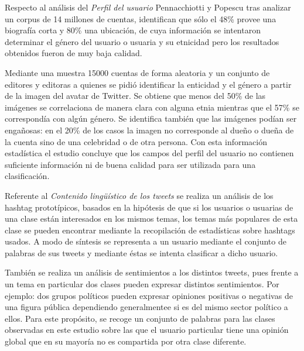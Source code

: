 	        Respecto al análisis del \emph{Perfil del usuario} Pennacchiotti y Popescu tras analizar un corpus de
	        14 millones de cuentas, identifican que sólo el 48\% provee una biografía corta y 80\% una ubicación, de cuya información se intentaron determinar el género del usuario o usuaria y su etnicidad pero los resultados obtenidos fueron de muy baja calidad. 
	        
	        Mediante una muestra 15000 cuentas de forma aleatoria y un conjunto de editores y editoras a quienes se pidió identificar la enticidad y el género a partir de la imagen del avatar de Twitter. Se obtiene que menos del 50\% de las imágenes se correlaciona de manera clara con alguna etnia mientras que el 57\% se correspondía con algún género. Se identifica también que las imágenes podían ser engañosas: en el 20\% de los casos la imagen no corresponde al dueño o dueña de la cuenta sino de una celebridad o de otra persona. Con esta información estadística el estudio concluye que los campos del perfil del usuario no contienen suficiente información ni de buena calidad para ser utilizada para una clasificación.
	        
	        
	        
	        
	        Referente al \emph{Contenido lingüístico de los tweets} se realiza un análisis de los hashtag prototípicos, basados en la hipótesis de que si los usuarios o usuarias de una clase están interesados en los mismos temas, los temas más populares de esta clase se pueden encontrar mediante la recopilación de estadísticas sobre hashtags usados. A modo de síntesis se representa a un usuario mediante el conjunto de palabras de sus tweets y mediante éstas se intenta clasificar a dicho usuario.
	               
	         También se realiza un análisis de sentimientos a los distintos tweets, pues frente a un tema en particular dos clases pueden expresar distintos sentimientos. Por ejemplo: dos grupos políticos pueden expresar opiniones positivas o negativas de una figura pública dependiendo generalmentee si es del mismo sector político a ellos.  Para este propósito, se recoge un conjunto de palabras para las clases observadas en este estudio sobre las que el usuario particular tiene una opinión global que en su mayoría no es compartida por otra clase diferente.

